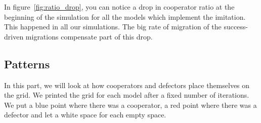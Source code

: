 \documentclass[11pt]{article}
\begin{document}
In figure~\ref{fig:ratio_drop}, you can notice a drop in cooperator ratio at the beginning of the simulation for all the models which implement the imitation. This happened in all our simulations. The big rate of migration of the success-driven migrations compensate part of this drop.

\newpage
\subsection{Patterns}

In this part, we will look at how cooperators and defectors place themselves on the grid. We printed the grid for each model after a fixed number of iterations. We put a blue point where there was a cooperator, a red point where there was a defector and let a white space for each empty space.
\end{document}
